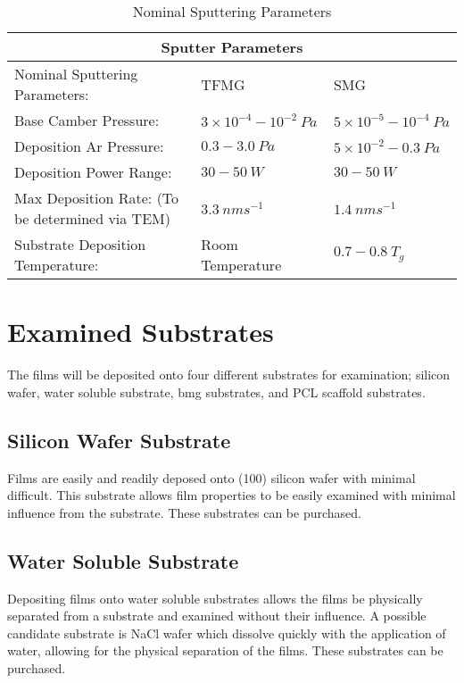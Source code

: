 \documentclass[a4paper,12pt,oneside]{report}%
\begin{document}
\begin{table}[h]
	\centering
	\begin{tabular}{ l l l }
		\toprule
		\multicolumn{3}{c}{Sputter Parameters}\\
		\midrule
		Nominal Sputtering Parameters: & TFMG & SMG \\
		\midrule
		Base Camber Pressure: & $3 \times 10^{-4} - 10^{-2}~ Pa$ & $5 \times 10^{-5} - 10^{-4}~ Pa$ \\
		Deposition Ar Pressure:	& $0.3 - 3.0~ Pa$ & $5\times 10^{-2} - 0.3~ Pa$\\
		Deposition Power Range:	& $30 - 50~ W$ & $30 - 50~ W$\\
		Max Deposition Rate: (To be determined via TEM) & $3.3~ nm s^{-1}$ & $1.4~ nm s^{-1}$ \\	 
		Substrate Deposition Temperature: & Room Temperature & $0.7 - 0.8~ T_{g}$ \\
		\bottomrule
	\end{tabular}
	\caption{Nominal Sputtering Parameters}
	\label{tab:NomSputterParameters}
\end{table}  	

\section{Examined Substrates} 
The films will be deposited onto four different substrates for examination; silicon wafer, water soluble substrate, \gls{bmg} substrates, and PCL scaffold substrates.

\subsection{Silicon Wafer Substrate}
Films are easily and readily deposed onto (100) silicon wafer with minimal difficult. This substrate allows film properties to be easily examined with minimal influence from the substrate. These substrates can be purchased. 

\subsection{Water Soluble Substrate} 
Depositing films onto water soluble substrates allows the films be physically separated from a substrate and examined without their influence. A possible candidate substrate is NaCl wafer which dissolve quickly with the application of water, allowing for the physical separation of the films. These substrates can be purchased. 
\end{document}

